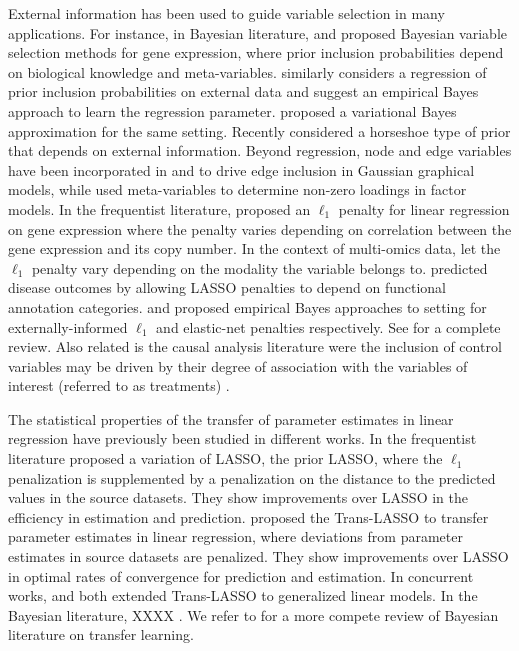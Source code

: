 \documentclass[
  12pt]{article}
\begin{document}
External information has been used to guide variable selection in many applications. For instance, in Bayesian literature, \cite{stingo:2011} and \cite{cassese:2014} proposed Bayesian variable selection methods for gene expression, where prior inclusion probabilities depend on biological knowledge and meta-variables. \cite{vandeWiel2019} similarly considers a regression of prior inclusion probabilities on external data and suggest an empirical Bayes approach to learn the regression parameter. \cite{Velten2021} proposed a variational Bayes approximation for the same setting. Recently \cite{busatto2023} considered a horseshoe type of prior that depends on external information. Beyond regression, node and edge variables have been incorporated in \cite{peterson} and \cite{jewson2023graphical} to drive edge inclusion in Gaussian graphical models, while \cite{schiavon2022generalized} used meta-variables to determine non-zero loadings in factor models. In the frequentist literature, \citet{Bergersen2011} proposed an $\ell_1$ penalty for linear regression on gene expression where the penalty varies depending on correlation between the gene expression and its copy number. In the context of multi-omics data, \cite{Boulesteix2017} let the $\ell_1$ penalty vary depending on the modality the variable belongs to. \cite{chen_tinghuei:2021} predicted disease outcomes by allowing LASSO penalties to depend on functional annotation categories. \cite{Zeng2020} and \cite{vanNee2023} proposed empirical Bayes approaches to setting for externally-informed $\ell_1$ and elastic-net penalties respectively. See \cite{vandewiel2024} for a complete review. Also related is the causal analysis literature were the inclusion of control variables may be driven by their degree of association with the variables of interest (referred to as treatments) \citep{belloni2014inference,antonelli2021bayesian}. 

The statistical properties of the transfer of parameter estimates in linear regression have previously been studied in different works. In the frequentist literature \cite{Jiang2016} proposed a variation of LASSO, the prior LASSO, where the $\ell_1$ penalization is supplemented by a penalization on the distance to the predicted values in the source datasets. They show improvements over LASSO in the efficiency in estimation and prediction. \cite{Li2021} proposed the Trans-LASSO to transfer parameter estimates in linear regression, where deviations from parameter estimates in source datasets are penalized. They show improvements over LASSO in optimal rates of convergence for prediction and estimation. In concurrent works, \cite{Li2024} and \cite{Tian2023} both extended Trans-LASSO to generalized linear models. In the Bayesian literature, XXXX . We refer to \cite{dunson} for a more compete review of Bayesian literature on transfer learning.
\end{document}
